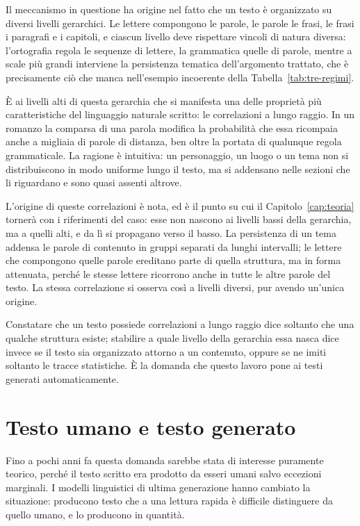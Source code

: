 Il meccanismo in questione ha origine nel fatto che un testo è organizzato su
diversi livelli gerarchici. Le lettere compongono le parole, le parole le frasi,
le frasi i paragrafi e i capitoli, e ciascun livello deve rispettare
vincoli di natura diversa: l'ortografia regola le sequenze di lettere, la
grammatica quelle di parole, mentre a scale più grandi interviene
la persistenza tematica dell'argomento trattato, che è precisamente ciò che
manca nell'esempio 
incoerente della Tabella~\ref{tab:tre-regimi}.

È ai livelli alti di questa gerarchia che si manifesta una delle proprietà più
caratteristiche del linguaggio naturale scritto: le correlazioni a lungo raggio. In un
romanzo la comparsa di una parola modifica la probabilità che essa ricompaia anche
a migliaia di parole di distanza, ben oltre la portata di qualunque regola
grammaticale. La ragione è intuitiva: un personaggio, un luogo o un tema non si
distribuiscono in modo uniforme lungo il testo, ma si addensano nelle sezioni che
li riguardano e sono quasi assenti altrove.

L'origine di queste correlazioni è nota, ed è il punto su cui il
Capitolo~\ref{cap:teoria} tornerà con i riferimenti del caso: esse non nascono
ai livelli bassi della gerarchia, ma a quelli alti, e da lì si propagano verso
il basso. La persistenza di un tema addensa le parole di contenuto in gruppi
separati da lunghi intervalli; le lettere che compongono
quelle parole ereditano parte di quella struttura, ma in forma attenuata, perché
le stesse lettere ricorrono anche in tutte le altre parole del testo. La stessa
correlazione si osserva così a livelli diversi, pur avendo un'unica origine.

Constatare che un testo possiede
correlazioni a lungo raggio dice soltanto che una qualche struttura esiste;
stabilire a quale livello della gerarchia essa nasca dice invece se il testo sia
organizzato attorno a un contenuto, oppure se ne imiti soltanto le tracce
statistiche. È la domanda che questo lavoro pone ai testi generati
automaticamente.

\section{Testo umano e testo generato}
\label{sec:intro-generato}

Fino a pochi anni fa questa domanda sarebbe stata di interesse puramente
teorico, perché il testo scritto era prodotto da esseri umani salvo eccezioni
marginali. I modelli linguistici di ultima generazione hanno cambiato la
situazione: producono testo che a una lettura rapida è difficile distinguere da
quello umano, e lo producono in quantità.

